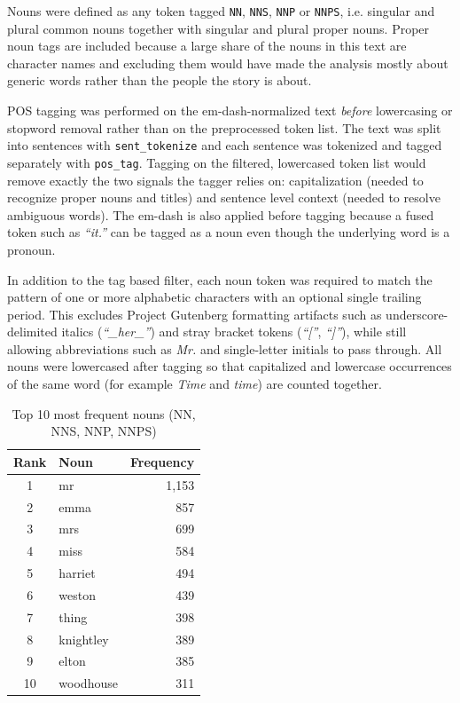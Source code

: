 \documentclass[sigconf]{acmart}
\begin{document}
Nouns were defined as any token tagged \texttt{NN}, \texttt{NNS},
\texttt{NNP} or \texttt{NNPS}, i.e. singular and plural common nouns
together with singular and plural proper nouns. Proper noun tags are
included because a large share of the nouns in this text are character
names and excluding them would have made the analysis mostly about generic
words rather than the people the story is about.

POS tagging was performed on the em-dash-normalized text \emph{before}
lowercasing or stopword removal rather than on the preprocessed token
list. The text was split into sentences with \texttt{sent\_tokenize} and
each sentence was tokenized and tagged separately with \texttt{pos\_tag}.
Tagging on the filtered, lowercased token list would remove exactly the two
signals the tagger relies on: capitalization (needed to recognize proper
nouns and titles) and sentence level context (needed to resolve ambiguous
words). The em-dash is also applied before tagging because a fused token such as \textit{``it.''} can be tagged as a noun even
though the underlying word is a pronoun.

In addition to the tag based filter, each noun token was required to match
the pattern of one or more alphabetic characters with an optional single
trailing period. This excludes Project Gutenberg formatting artifacts such
as underscore-delimited italics (\textit{``\_her\_''}) and stray bracket
tokens (\textit{``[''}, \textit{``]''}), while still allowing abbreviations
such as \textit{Mr.} and single-letter initials to pass through. All nouns
were lowercased after tagging so that capitalized and lowercase
occurrences of the same word (for example \textit{Time} and \textit{time})
are counted together.

\begin{table}[H]
\caption{Top 10 most frequent nouns (NN, NNS, NNP, NNPS)}
\label{tab:partC}
\centering
\begin{tabular}{clr}
\toprule
Rank & Noun & Frequency \\
\midrule
1  & mr        & 1{,}153 \\
2  & emma      & 857 \\
3  & mrs       & 699 \\
4  & miss      & 584 \\
5  & harriet   & 494 \\
6  & weston    & 439 \\
7  & thing     & 398 \\
8  & knightley & 389 \\
9  & elton     & 385 \\
10 & woodhouse & 311 \\
\bottomrule
\end{tabular}
\end{table}
\end{document}
